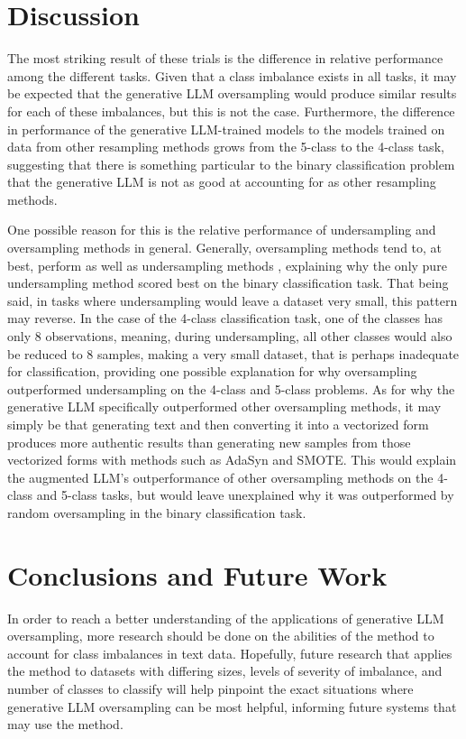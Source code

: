 \documentclass[runningheads]{llncs}
\begin{document}
\section{Discussion}
The most striking result of these trials is the difference in relative performance among the different tasks. Given that a class imbalance exists in all tasks, it may be expected that the generative LLM oversampling would produce similar results for each of these imbalances, but this is not the case. Furthermore, the difference in performance of the generative LLM-trained models to the models trained on data from other resampling methods grows from the 5-class to the 4-class task, suggesting that there is something particular to the binary classification problem that the generative LLM is not as good at accounting for as other resampling methods.

One possible reason for this is the relative performance of undersampling and oversampling methods in general. Generally, oversampling methods tend to, at best, perform as well as undersampling methods \cite{drummond}, explaining why the only pure undersampling method scored best on the binary classification task. That being said, in tasks where undersampling would leave a dataset very small, this pattern may reverse. In the case of the 4-class classification task, one of the classes has only 8 observations, meaning, during undersampling, all other classes would also be reduced to 8 samples, making a very small dataset, that is perhaps inadequate for classification, providing one possible explanation for why oversampling outperformed undersampling on the 4-class and 5-class problems. As for why the generative LLM specifically outperformed other oversampling methods, it may simply be that generating text and then converting it into a vectorized form produces more authentic results than generating new samples from those vectorized forms with methods such as AdaSyn and SMOTE. This would explain the augmented LLM's outperformance of other oversampling methods on the 4-class and 5-class tasks, but would leave unexplained why it was outperformed by random oversampling in the binary classification task.

\section{Conclusions and Future Work}
In order to reach a better understanding of the applications of generative LLM oversampling, more research should be done on the abilities of the method to account for class imbalances in text data. Hopefully, future research that applies the method to datasets with differing sizes, levels of severity of imbalance, and number of classes to classify will help pinpoint the exact situations where generative LLM oversampling can be most helpful, informing future systems that may use the method.
\end{document}
